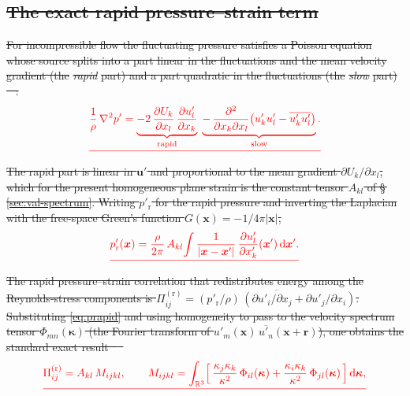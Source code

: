 \documentclass[lineno]{JFM-FLM_Au}
\providecommand{\DIFdel}[1]{{\protect\color{red}\sout{#1}}}                      %
\begin{document}
\subsection{\DIFdel{The exact rapid pressure--strain term}}%
\addtocounter{subsection}{-1}%

\DIFdel{For incompressible flow the fluctuating pressure satisfies a Poisson equation
whose source splits into a part linear in the fluctuations and the mean
velocity gradient (the }\emph{\DIFdel{rapid}} %
\DIFdel{part) and a part quadratic in the
fluctuations (the }\emph{\DIFdel{slow}} %
\DIFdel{part) \mbox{%
\citep{Pope2000}}\hskip0pt%
:
}\begin{displaymath}
  \DIFdel{\frac{1}{\rho}\,\nabla^2 p'
  = \underbrace{-2\,\frac{\partial U_k}{\partial x_l}\,
      \frac{\partial u'_l}{\partial x_k}}_{\text{rapid}}
    \;\underbrace{-\,\frac{\partial^2}{\partial x_k\partial x_l}
      \bigl(u'_k u'_l - \overline{u'_k u'_l}\bigr)}_{\text{slow}} .
}\end{displaymath}%
\DIFdel{The rapid part is linear in $\boldsymbol{u}'$ and proportional to the mean
gradient $\partial U_k/\partial x_l$, which for the present homogeneous plane
strain is the constant tensor $A_{kl}$ of \S\,\ref{sec:val-spectrum}. Writing
$p'_{\mathrm r}$ for the rapid pressure and inverting the Laplacian with the
free-space Green's function $G(\boldsymbol{x})=-1/4\pi|\boldsymbol{x}|$,
}\begin{displaymath}
  \DIFdel{p'_{\mathrm r}(\boldsymbol{x})
  = \frac{\rho}{2\pi}\,A_{kl}\!\int
    \frac{1}{|\boldsymbol{x}-\boldsymbol{x}'|}\,
    \frac{\partial u'_l}{\partial x'_k}(\boldsymbol{x}')\,
    \mathrm{d}\boldsymbol{x}' .
}\end{displaymath}%
\DIFdel{The rapid pressure--strain correlation that redistributes energy among the
Reynolds-stress components is
$\Pi^{(\mathrm r)}_{ij}
   = \overline{(p'_{\mathrm r}/\rho)\,(\partial u'_i/\partial x_j
     + \partial u'_j/\partial x_i)}$.
Substituting \eqref{eq:prapid} and using homogeneity to pass to the
velocity spectrum tensor
$\Phi_{mn}(\boldsymbol{\kappa})$
(the Fourier transform of $\overline{u'_m(\boldsymbol{x})\,
u'_n(\boldsymbol{x}+\boldsymbol{r})}$),
one obtains the standard exact result
\mbox{%
\citep{BatchelorProudman1954,Crow1968,HuntCarruthers1990}
}\hskip0pt%
}\begin{displaymath}
  \DIFdel{\Pi^{(\mathrm r)}_{ij}
  = A_{kl}\,M_{ijkl},
  \qquad
  M_{ijkl}
  = \int_{\mathbb{R}^3}
    \Bigl[\,
      \frac{\kappa_j\kappa_k}{\kappa^2}\,\Phi_{il}(\boldsymbol{\kappa})
      + \frac{\kappa_i\kappa_k}{\kappa^2}\,\Phi_{jl}(\boldsymbol{\kappa})
    \,\Bigr]\,\mathrm{d}\boldsymbol{\kappa},
}\end{displaymath}%
\end{document}
